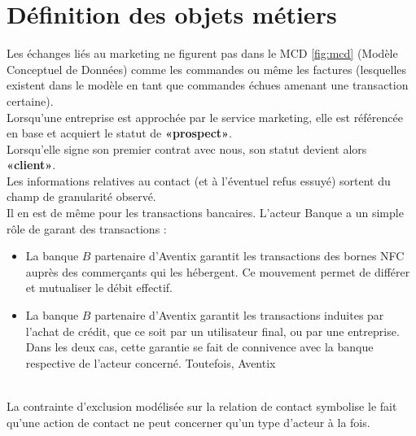 
\usepackage{rotating}




\section{Définition des objets métiers}

Les échanges liés au marketing ne figurent pas dans le MCD \ref{fig:mcd}
(Modèle Conceptuel de Données) comme les commandes ou même les factures
(lesquelles existent dans le modèle en tant que commandes échues amenant une
transaction certaine). \\

Lorsqu'une entreprise est approchée par le service marketing, elle est
référencée en base et  acquiert le statut de \textbf{«prospect»}. \\

Lorsqu'elle signe son premier contrat avec nous, son statut devient alors
\textbf{«client»}. \\

Les informations relatives au contact (et à l'éventuel refus essuyé) sortent du
champ de granularité observé. \\

Il en est de même pour les transactions bancaires. L'acteur Banque a un simple
rôle de garant des transactions : \\
\begin{itemize}
  \item La banque $B$ partenaire d'Aventix garantit les transactions des bornes
    NFC auprès des commerçants qui les hébergent. Ce mouvement permet de
    différer et mutualiser le débit effectif.
  \item La banque $B$ partenaire d'Aventix garantit les transactions induites
    par l'achat de crédit, que ce soit par un utilisateur final, ou par une
    entreprise. Dans les deux cas, cette garantie se fait de connivence avec la
    banque respective de l'acteur concerné. Toutefois, Aventix %
\end{itemize}
~\\

La contrainte d'exclusion modélisée sur la relation de contact symbolise le
fait qu'une action de contact ne peut concerner qu'un type d'acteur à la fois. \\


